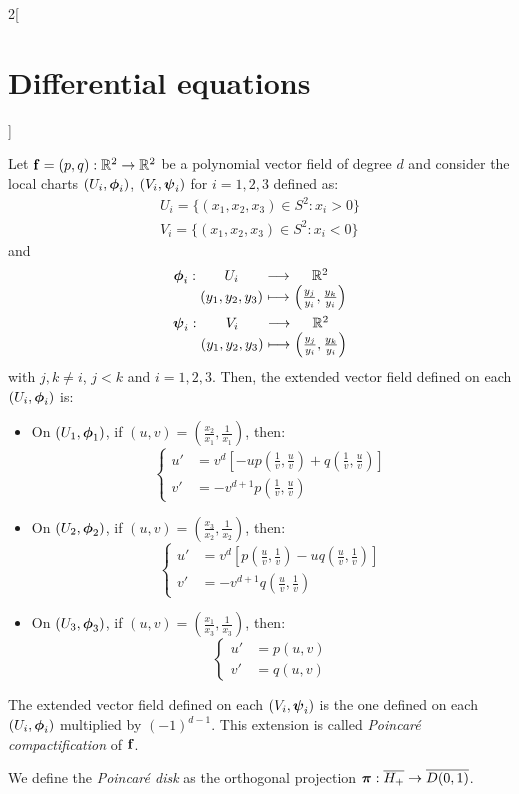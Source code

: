 \documentclass[../../../main_math.tex]{subfiles}
\begin{document}
\begin{multicols}{2}[\section{Differential equations}]
\begin{proposition}
  \end{proposition}
  \begin{corollary}
    Let $\boldsymbol{\mathrm{f}}=(p,q):\mathbb{R}^2\rightarrow\mathbb{R}^2$ be a polynomial vector field of degree $d$ and consider the local charts $(U_i,\boldsymbol{\mathrm{\phi}}_i)$, $(V_i,\boldsymbol{\mathrm{\psi}}_i)$ for $i=1,2,3$ defined as:
    \begin{gather*}
      U_i=\{(x_1,x_2,x_3)\in S^2:x_i>0\}\\
      V_i=\{(x_1,x_2,x_3)\in S^2:x_i<0\}
    \end{gather*}
    and
    \begin{gather*}
      \function{\vf\phi_i}{U_i}{\RR^2}{(y_1,y_2,y_3)}{\left(\frac{y_j}{y_i},\frac{y_k}{y_i}\right)}\\
      \function{\vf\psi_i}{V_i}{\RR^2}{(y_1,y_2,y_3)}{\left(\frac{y_j}{y_i},\frac{y_k}{y_i}\right)}
    \end{gather*}
    with $j,k\ne i$, $j<k$ and $i=1,2,3$. Then, the extended vector field defined on each $(U_i,\boldsymbol{\mathrm{\phi}}_i)$ is:
    \begin{itemize}
      \item On $(U_1,\boldsymbol{\mathrm{\phi}}_1)$, if $(u,v)=\left(\frac{x_2}{x_1},\frac{1}{x_1}\right)$, then:
            $$
              \left\{
              \begin{aligned}
                u' & =v^d\left[-up\left(\frac{1}{v},\frac{u}{v}\right)+q\left(\frac{1}{v},\frac{u}{v}\right)\right] \\
                v' & =-v^{d+1}p\left(\frac{1}{v},\frac{u}{v}\right)
              \end{aligned}
              \right.
            $$
      \item On $(U_2,\boldsymbol{\mathrm{\phi}}_2)$, if $(u,v)=\left(\frac{x_3}{x_2},\frac{1}{x_2}\right)$, then:
            $$
              \left\{
              \begin{aligned}
                u' & =v^d\left[p\left(\frac{u}{v},\frac{1}{v}\right)-uq\left(\frac{u}{v},\frac{1}{v}\right)\right] \\
                v' & =-v^{d+1}q\left(\frac{u}{v},\frac{1}{v}\right)
              \end{aligned}
              \right.
            $$
      \item On $(U_3,\boldsymbol{\mathrm{\phi}}_3)$, if $(u,v)=\left(\frac{x_1}{x_3},\frac{1}{x_3}\right)$, then:
            $$
              \left\{
              \begin{aligned}
                u' & =p(u,v) \\
                v' & =q(u,v)
              \end{aligned}
              \right.
            $$
    \end{itemize}
    The extended vector field defined on each $(V_i,\boldsymbol{\mathrm{\psi}}_i)$ is the one defined on each $(U_i,\boldsymbol{\mathrm{\phi}}_i)$ multiplied by ${(-1)}^{d-1}$.
    This extension is called \emph{Poincaré compactification} of $\boldsymbol{\mathrm{f}}$.
  \end{corollary}
  \begin{definition}
    We define the \emph{Poincaré disk} as the orthogonal projection $\boldsymbol{\mathrm{\pi}}: \overline{H_+}\rightarrow \overline{D(0,1)}$.
  \end{definition}

\end{multicols}
\end{document}
